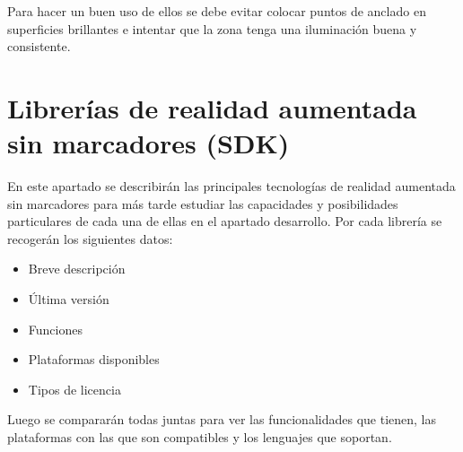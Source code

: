 Para hacer un buen uso de ellos se debe evitar colocar puntos de anclado en superficies brillantes e intentar que la zona tenga una iluminación buena y consistente.
\section{Librerías de realidad aumentada sin marcadores (SDK)}

En este apartado se describirán las principales tecnologías de realidad aumentada sin marcadores para más tarde estudiar las capacidades y posibilidades particulares de cada una de ellas en el apartado desarrollo.
Por cada librería se recogerán los siguientes datos:
\begin{itemize}
\item Breve descripción
\item Última versión
\item Funciones
\item Plataformas disponibles
\item Tipos de licencia
\end{itemize}
Luego se compararán todas juntas para ver las funcionalidades que tienen, las plataformas con las que son compatibles y los lenguajes que soportan.
\clearpage
